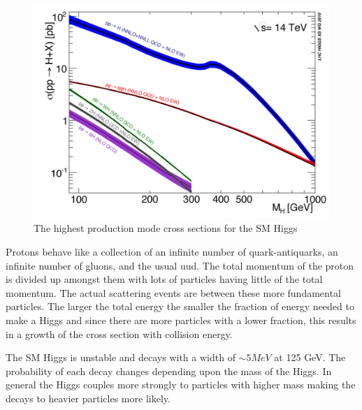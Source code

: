 \begin{figure}[h!]
  \centering
  \includegraphics[width=5in]{images/14TeV_higgs_cross_sections.png}
  \caption
   {The highest production mode cross sections for the SM Higgs \cite{crossbranchplots}}
  \label{fig:hprodcross}
\end{figure}

Protons behave like a collection of an infinite number of quark-antiquarks, an infinite number of gluons, and the usual uud. The total momentum of the proton is divided up amongst them with lots of particles having little of the total momentum. The actual scattering events are between these more fundamental particles. The larger the total energy the smaller the fraction of energy needed to make a Higgs and since there are more particles with a lower fraction, this results in a growth of the cross section with collision energy. 

The SM Higgs is unstable and decays with a width of $\sim 5 MeV$ at 125 GeV. The probability of each decay changes depending upon the mass of the Higgs. In general the Higgs couples more strongly to particles with higher mass making the decays to heavier particles more likely.  

